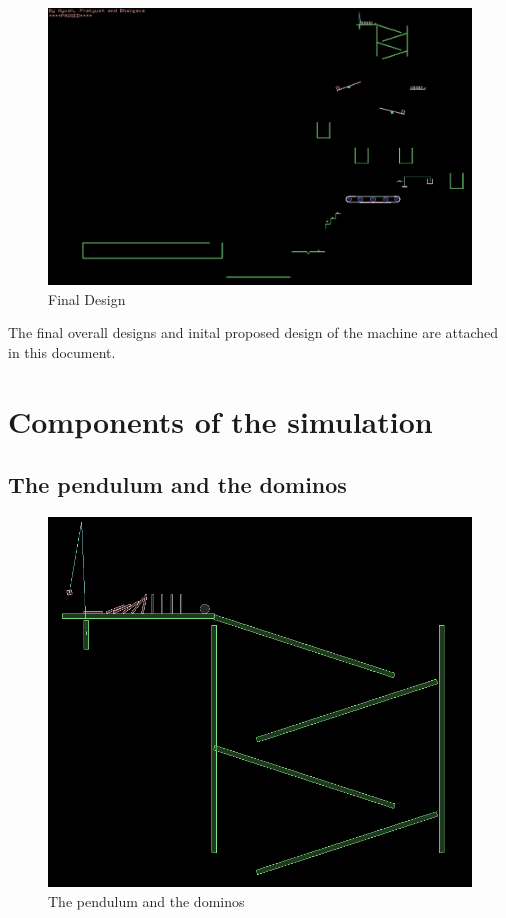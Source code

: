 \documentclass[a4paper,11pt]{article}
\begin{document}
	\begin{figure}
	\includegraphics[scale=0.35]{01_whole_sim.png}
	\caption{Final Design}
	\end{figure}    
The final overall designs and inital proposed design of the machine are attached in this document.
\pagebreak
  \section{Components of the simulation}
  \subsection{The pendulum and the dominos}
  	\begin{figure}
	\includegraphics[scale=0.35]{03_pendulum_hits_dominos.png}
	\caption{The pendulum and the dominos}
	\end{figure}  
         
\end{document}
